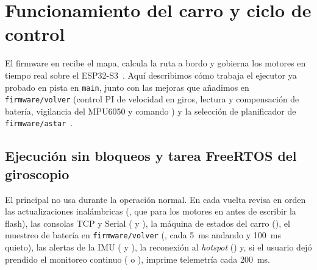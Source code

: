 \section{Funcionamiento del carro y ciclo de control}
\label{sec:control}

El firmware en  recibe el mapa, calcula la ruta a bordo y gobierna los motores en tiempo real sobre el ESP32-S3~\cite{espressif2024esp32s3,repo2026agentelaberinto}. Aquí describimos cómo trabaja el ejecutor ya probado en pista en \texttt{main}, junto con las mejoras que añadimos en \texttt{firmware/volver} (control PI de velocidad en giros, lectura y compensación de batería, vigilancia del MPU6050 y comando ) y la selección de planificador de \texttt{firmware/astar}~\cite{arquitectura2026doc,handoff2026doc}.

\subsection{Ejecución sin bloqueos y tarea FreeRTOS del giroscopio}
\label{subsec:tiempo-real}

El  principal no usa  durante la operación normal. En cada vuelta revisa en orden las actualizaciones inalámbricas (, que para los motores en  antes de escribir la flash), las consolas TCP y Serial ( y ), la máquina de estados del carro (), el muestreo de batería en \texttt{firmware/volver} (, cada \SI{5}{\milli\second} andando y \SI{100}{\milli\second} quieto), las alertas de la IMU ( y ), la reconexión al \emph{hotspot} () y, si el usuario dejó prendido el monitoreo continuo ( o ), imprime telemetría cada \SI{200}{\milli\second}.

